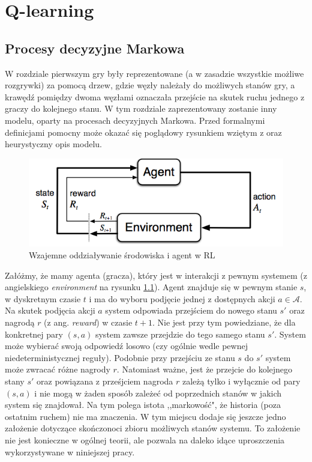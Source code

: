 \documentclass[licencjacka]{pracamgr}
\begin{document}
\chapter{Q-learning}\label{r:Tablica}

\section{Procesy decyzyjne Markowa}
W rozdziale pierwszym gry były reprezentowane (a w zasadzie wszystkie możliwe rozgrywki) za pomocą drzew, gdzie węzły należały do możliwych stanów gry, a krawędź pomiędzy dwoma węzłami oznaczała przejście na skutek ruchu jednego z graczy do kolejnego stanu. W tym rozdziale zaprezentowany zostanie inny modelu, oparty na procesach decyzyjnych Markowa.  Przed formalnymi definicjami pomocny może okazać się poglądowy rysunkiem wziętym z \cite{RL} oraz  heurystyczny opis modelu.\\

\begin{figure}[h!]
	\includegraphics [scale=0.6] {agent_env.png}
	\caption{Wzajemne oddziaływanie środowiska i agent w RL}
	\label{Rys7}
\end{figure}

Załóżmy, że mamy agenta (gracza), który jest w interakcji z pewnym systemem (z angielskiego \textit{environment} na rysunku \ref{Rys7}). Agent znajduje się w pewnym stanie $s$, w dyskretnym czasie $t$ i ma do wyboru podjęcie jednej z dostępnych akcji $a\in\mathcal{A}$. Na skutek podjęcia akcji $a$ system odpowiada przejściem do nowego stanu $s'$ oraz nagrodą $r$ (z ang. \textit{reward}) w czasie $t+1$.  Nie jest przy tym powiedziane, że dla konkretnej pary $(s,a)$ system zawsze przejdzie do tego samego stanu $s'$. System może wybierać swoją odpowiedź losowo (czy ogólnie wedle pewnej niedeterministycznej reguły). Podobnie przy przejściu ze stanu $s$ do $s'$ system może zwracać różne nagrody $r$.  Natomiast ważne, jest że przejcie do kolejnego stany $s'$ oraz powiązana z prześjciem nagroda $r$ zależą tylko i wyłącznie od pary $(s,a)$ i nie mogą w  żaden sposób zależeć od poprzednich stanów w jakich system się znajdował. Na tym polega istota ,,markowość", że historia (poza ostatnim ruchem) nie ma znaczenia. W tym miejscu dodaje się jeszcze jedno założenie dotyczące skończonoci  zbioru możliwych stanów systemu. To założenie nie jest konieczne w ogólnej teorii, ale pozwala na daleko idące uproszczenia wykorzystywane w niniejszej pracy.\\
\end{document}
